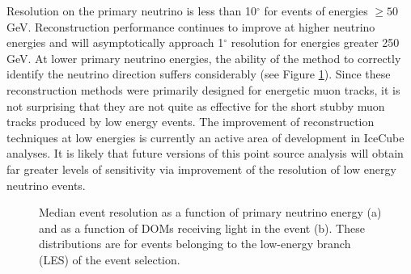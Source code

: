 \documentclass{gatech-thesis}
\begin{document}
Resolution on the primary neutrino is less than 10$^{\circ}$ for events of energies $\geq 50$GeV. Reconstruction performance continues to improve at higher neutrino energies and will asymptotically approach 1$^{\circ}$ resolution for energies greater 250 GeV. At lower primary neutrino energies, the ability of the method to correctly identify the neutrino direction suffers considerably (see Figure \ref{fig:EventRes}). Since these reconstruction methods were primarily designed for energetic muon tracks, it is not surprising that they are not quite as effective for the short stubby muon tracks produced by low energy events. The improvement of reconstruction techniques at low energies is currently an active area of development in IceCube analyses. It is likely that future versions of this point source analysis will obtain far greater levels of sensitivity via improvement of the resolution of low energy neutrino events.
\begin{figure}
\centering
{}
\caption{Median event resolution as a function of primary neutrino energy (a) and as a function of DOMs receiving light in the event (b). These distributions are for events belonging to the low-energy branch (LES) of the event selection.}
\label{fig:EventRes}
\end{figure}
\end{document}
